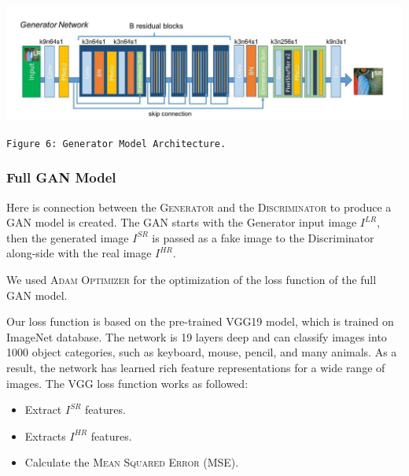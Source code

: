\documentclass[12pt]{article}
\begin{document}
				\begin{center}
					\vspace{0.1in}
					\includegraphics[width=6in]{Images/Generator.jpeg}
				
					\texttt{Figure 6: Generator Model Architecture.}
					\vspace{0.1in}
				\end{center}
			\subsubsection{Full GAN Model}
				Here is connection between the \textsc{Generator} and the \textsc{Discriminator} to produce a GAN model is created. The GAN starts with the Generator input image $I^{LR}$, then the generated image $I^{SR}$ is passed as a fake image to the Discriminator along-side with the real image $I^{HR}$.
				
				We used \textsc{Adam Optimizer} for the optimization of the loss function of the full GAN model.
				
				Our loss function is based on the pre-trained \textsc{VGG19} model, which is trained on ImageNet database. The network is 19 layers deep and can classify images into 1000 object categories, such as keyboard, mouse, pencil, and many animals. As a result, the network has learned rich feature representations for a wide range of images. The VGG loss function works as followed:
				\begin{itemize}
					\item Extract $I^{SR}$ features.
					\item Extracts $I^{HR}$ features.
					\item Calculate the \textsc{Mean Squared Error} (MSE).
				\end{itemize}
			
\end{document}
